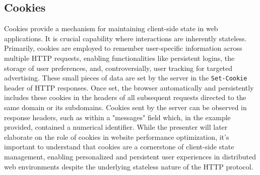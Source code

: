 \subsection{Cookies}
Cookies provide a mechanism for maintaining client-side state in web applications. It is crucial capability where interactions are inherently stateless. Primarily, cookies are employed to remember user-specific information across multiple HTTP requests, enabling functionalities like persistent logins, the storage of user preferences, and, controversially, user tracking for targeted advertising. These small pieces of data are set by the server in the \texttt{Set-Cookie} header of HTTP responses. Once set, the browser automatically and persistently includes these cookies in the headers of all subsequent requests directed to the same domain or its subdomains. Cookies sent by the server can be observed in response headers, such as within a "messages" field which, in the example provided, contained a numerical identifier.  While the presenter will later elaborate on the role of cookies in website performance optimization, it's important to understand that cookies are a cornerstone of client-side state management, enabling personalized and persistent user experiences in distributed web environments despite the underlying stateless nature of the HTTP protocol. 


